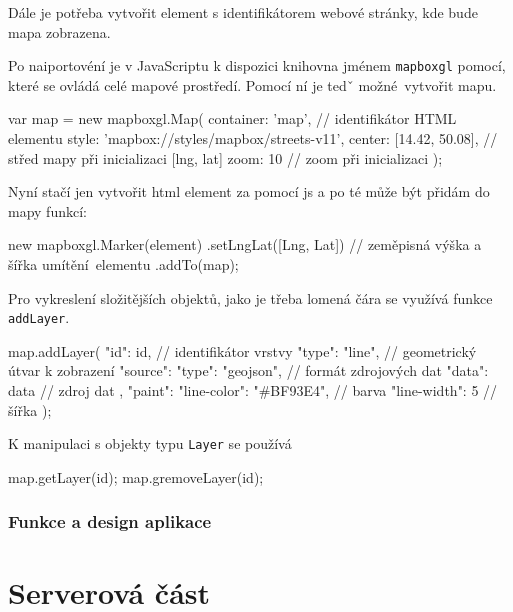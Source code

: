 \bigbreak

Dále je potřeba vytvořit element s identifikátorem webové stránky, kde bude mapa zobrazena.

\bigbreak

Po naiportovéní je v JavaScriptu k dispozici knihovna jménem \verb-mapboxgl- pomocí, které se ovládá celé mapové prostředí. Pomocí ní je tedˇ možné vytvořit mapu.
\begin{code}[frame=none]
var map = new mapboxgl.Map({
	container: 'map', // identifikátor HTML elementu
	style: 'mapbox://styles/mapbox/streets-v11',
	center: [14.42, 50.08], // střed mapy při
		inicializaci [lng, lat]
	zoom: 10 // zoom při inicializaci
});
\end{code}

\bigbreak

Nyní stačí jen vytvořit \gls{html} element za pomocí \gls{js} a po té může být přidám do mapy funkcí:
\begin{code}[frame=none]
new mapboxgl.Marker(element)
	.setLngLat([Lng, Lat]) // zeměpisná výška a šířka
		umítění elementu
	.addTo(map);
\end{code}

\bigbreak

Pro vykreslení složitějších objektů, jako je třeba lomená čára se využívá funkce \verb-addLayer-.
\begin{code}[frame=none]
map.addLayer({
	"id": id, // identifikátor vrstvy
	"type": "line", // geometrický útvar k zobrazení
	"source": {
		"type": "geojson", // formát zdrojových dat
		"data": data // zdroj dat
	},
	"paint": {
		"line-color": "#BF93E4", // barva
		"line-width": 5 // šířka
	}
});
\end{code}

\bigbreak

K manipulaci s objekty typu \verb-Layer- se používá
\begin{code}[frame=none]
map.getLayer(id);
map.gremoveLayer(id);
\end{code}

\subsubsection{Funkce a design aplikace}



\section{Serverová část}

